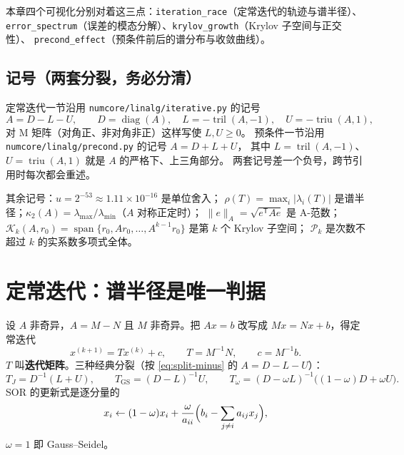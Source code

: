 本章四个可视化分别对着这三点：\texttt{iteration\_race}（定常迭代的轨迹与谱半径）、
\texttt{error\_spectrum}（误差的模态分解）、\texttt{krylov\_growth}（Krylov 子空间与正交性）、
\texttt{precond\_effect}（预条件前后的谱分布与收敛曲线）。

\subsection*{记号（两套分裂，务必分清）}

定常迭代一节沿用 \texttt{numcore/linalg/iterative.py} 的记号
\begin{equation}
  A = D - L - U,\qquad
  D=\operatorname{diag}(A),\quad
  L=-\operatorname{tril}(A,-1),\quad
  U=-\operatorname{triu}(A,1),
  \label{eq:split-minus}
\end{equation}
对 M 矩阵（对角正、非对角非正）这样写使 $L,U\ge0$。
预条件一节沿用 \texttt{numcore/linalg/precond.py} 的记号 $A=D+L+U$，
其中 $L=\operatorname{tril}(A,-1)$、$U=\operatorname{triu}(A,1)$ 就是 $A$ 的严格下、上三角部分。
两套记号差一个负号，跨节引用时每次都会重述。

其余记号：$u=2^{-53}\approx1.11\times10^{-16}$ 是单位舍入；
$\rho(T)=\max_i|\lambda_i(T)|$ 是谱半径；$\kappa_2(A)=\lambda_{\max}/\lambda_{\min}$（$A$ 对称正定时）；
$\|e\|_A=\sqrt{e^{\mathsf T}Ae}$ 是 A-范数；
$\mathcal K_k(A,r_0)=\operatorname{span}\{r_0,Ar_0,\dots,A^{k-1}r_0\}$ 是第 $k$ 个 Krylov 子空间；
$\mathcal P_k$ 是次数不超过 $k$ 的实系数多项式全体。

\section{定常迭代：谱半径是唯一判据}

\begin{definition}[分裂与迭代矩阵]
设 $A$ 非奇异，$A=M-N$ 且 $M$ 非奇异。把 $Ax=b$ 改写成 $Mx=Nx+b$，得定常迭代
\begin{equation}
  x^{(k+1)} = T x^{(k)} + c,\qquad T=M^{-1}N,\qquad c=M^{-1}b .
  \label{eq:stationary}
\end{equation}
$T$ 叫\textbf{迭代矩阵}。三种经典分裂（按 \eqref{eq:split-minus} 的 $A=D-L-U$）：
\begin{equation}
  T_J=D^{-1}(L+U),\qquad
  T_{\mathrm{GS}}=(D-L)^{-1}U,\qquad
  T_\omega=(D-\omega L)^{-1}\bigl((1-\omega)D+\omega U\bigr).
  \label{eq:iters}
\end{equation}
SOR 的更新式是逐分量的
\begin{equation}
  x_i\leftarrow(1-\omega)x_i+\frac{\omega}{a_{ii}}\Bigl(b_i-\sum_{j\ne i}a_{ij}x_j\Bigr),
\end{equation}
$\omega=1$ 即 Gauss--Seidel。
\end{definition}

